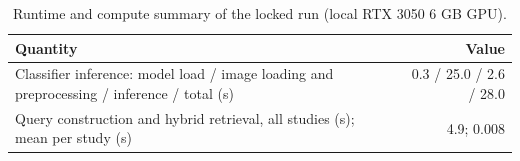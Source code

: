 \begin{table}[t]
\centering
\scriptsize
\begin{tabular}{lr}
\hline
Quantity & Value \\
\hline
Classifier inference: model load / image loading and preprocessing / inference / total (s) & 0.3 / 25.0 / 2.6 / 28.0 \\
Query construction and hybrid retrieval, all studies (s); mean per study (s) & 4.9; 0.008 \\
\hline
\end{tabular}
\caption{Runtime and compute summary of the locked run (local RTX 3050 6 GB GPU).}
\label{tab:table10_runtime_compute}
\end{table}
